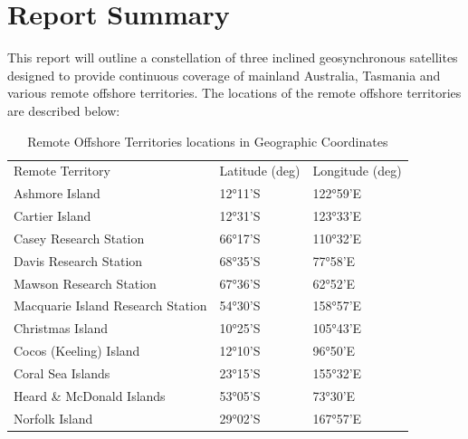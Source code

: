 \documentclass[12pt]{article}
\begin{document}
\FirstPage
\pagebreak

\setlength{\parskip}{0em}
\renewcommand{\baselinestretch}{0.95}\normalsize
\tableofcontents
\renewcommand{\baselinestretch}{1.0}\normalsize
\setlength{\parskip}{1em}
\newpage

\section{Report Summary}

\raggedright

This report will outline a constellation of three inclined geosynchronous satellites designed to provide continuous coverage of mainland Australia, Tasmania and various remote offshore territories. The locations of the remote offshore territories are described below:

\begin{table}[H]
\begin{tabular}{lll}
 \hline
Remote Territory                  & Latitude (deg) & Longitude (deg) \\
Ashmore Island                    & 12°11'S        & 122°59'E        \\
Cartier Island                    & 12°31'S        & 123°33'E        \\
Casey Research Station            & 66°17'S        & 110°32'E        \\
Davis Research Station            & 68°35'S        & 77°58'E         \\
Mawson Research Station           & 67°36'S        & 62°52'E         \\
Macquarie Island Research Station & 54°30'S        & 158°57'E        \\
Christmas Island                  & 10°25'S        & 105°43'E        \\
Cocos (Keeling) Island            & 12°10'S        & 96°50'E         \\
Coral Sea Islands                 & 23°15'S        & 155°32'E        \\
Heard \& McDonald Islands         & 53°05'S        & 73°30'E         \\
Norfolk Island                    & 29°02'S        & 167°57'E       \\  \hline
\end{tabular}
\caption{Remote Offshore Territories locations in Geographic Coordinates}
\label{table:remote_offshore}
\end{table}
\end{document}
